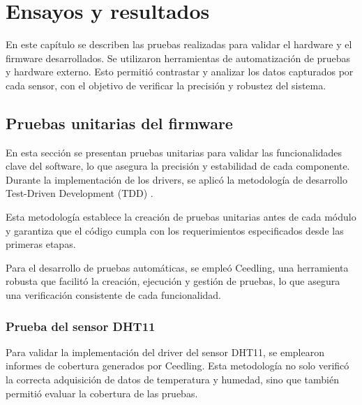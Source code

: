 
\chapter{Ensayos y resultados} %

\label{Chapter4} %

En este capítulo se describen las pruebas realizadas para validar el hardware y el firmware desarrollados. Se utilizaron herramientas de automatización de pruebas y hardware externo. Esto permitió contrastar y analizar los datos capturados por cada sensor, con el objetivo de verificar la precisión y robustez del sistema.


\section{Pruebas unitarias del firmware}
\label{sec:pruebas_unitarias}

En esta sección se presentan pruebas unitarias para validar las funcionalidades clave del software, lo que asegura la precisión y estabilidad de cada componente. Durante la implementación de los drivers, se aplicó la metodología de desarrollo Test-Driven Development (TDD) \citep{ieee2023}.

Esta metodología establece la creación de pruebas unitarias antes de cada módulo y garantiza que el código cumpla con los requerimientos especificados desde las primeras etapas.

Para el desarrollo de pruebas automáticas, se empleó Ceedling, una herramienta robusta que facilitó la creación, ejecución y gestión de pruebas, lo que asegura una verificación consistente de cada funcionalidad.

\subsection{Prueba del sensor DHT11}
Para validar la implementación del driver del sensor DHT11, se emplearon informes de cobertura generados por Ceedling. Esta metodología no solo verificó la correcta adquisición de datos de temperatura y humedad, sino que también permitió evaluar la cobertura de las pruebas.

